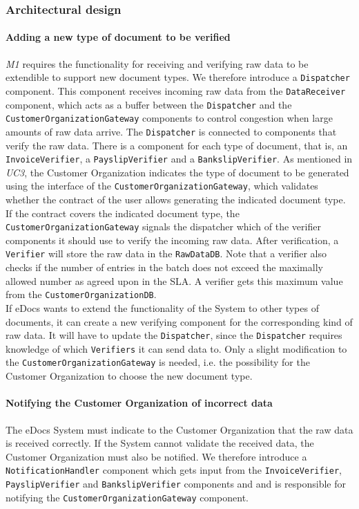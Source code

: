 \documentclass[a4paper,10pt]{article}
\begin{document}
\subsubsection{Architectural design}
\paragraph{Adding a new type of document to be verified} \emph{M1} requires the functionality for receiving and verifying raw data to be extendible to support new document types. We therefore introduce a \texttt{Dispatcher} component. This component receives incoming raw data from the \texttt{DataReceiver} component, which acts as a buffer between the \texttt{Dispatcher} and the \texttt{CustomerOrganizationGateway} components to control congestion when large amounts of raw data arrive. The \texttt{Dispatcher} is connected to components that verify the raw data. There is a component for each type of document, that is, an \texttt{InvoiceVerifier}, a \texttt{PayslipVerifier} and a \texttt{BankslipVerifier}. As mentioned in \emph{UC3}, the Customer Organization indicates the type of document to be generated using the interface of the \texttt{CustomerOrganizationGateway}, which validates whether the contract of the user allows generating the indicated document type. If the contract covers the indicated document type, the \texttt{CustomerOrganizationGateway} signals the dispatcher which of the verifier components it should use to verify the incoming raw data. After verification, a \texttt{Verifier} will store the raw data in the \texttt{RawDataDB}. Note that a verifier also checks if the number of entries in the batch does not exceed the maximally allowed number as agreed upon in the SLA. A verifier gets this maximum value from the \texttt{CustomerOrganizationDB}.\\

If eDocs wants to extend the functionality  of the System to other types of documents, it can create a new verifying component for the corresponding kind of raw data. It will have to update the \texttt{Dispatcher}, since the \texttt{Dispatcher} requires knowledge of which \texttt{Verifiers} it can send data to. Only a slight modification to the \texttt{CustomerOrganizationGateway} is needed, i.e. the possibility for the Customer Organization to choose the new document type.

\paragraph{Notifying the Customer Organization of incorrect data}
The eDocs System must indicate to the Customer Organization that the raw data is received correctly. If the System cannot validate the received data, the Customer Organization must also be notified. We therefore introduce a \texttt{NotificationHandler} component which gets input from the \texttt{InvoiceVerifier}, \texttt{PayslipVerifier} and \texttt{BankslipVerifier} components and and is responsible for notifying the \texttt{CustomerOrganizationGateway} component.
\end{document}
